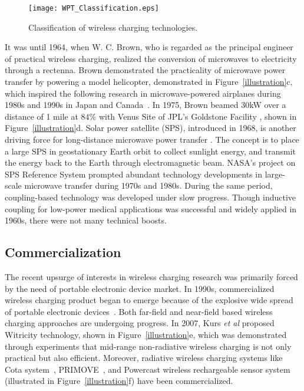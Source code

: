 \documentclass[twocolumn,10pt]{IEEEtran}
\begin{document}
\begin{figure*}
\centering
\texttt{[image: WPT\_Classification.eps]}
\caption{Classification of wireless charging technologies.} \label{WPT_Classification}
\end{figure*}




It was until 1964, when W. C. Brown, who is regarded as the principal engineer of practical wireless charging, realized the conversion of microwaves to electricity through a rectenna.
Brown demonstrated the practicality of microwave power transfer by powering a model helicopter, demonstrated in Figure~\ref{illustration}c, which inspired the following research in microwave-powered airplanes during 1980s and 1990s in Japan and Canada~\cite{J.1988Schlesak}. In 1975, Brown beamed 30kW over a distance of 1 mile at $84\%$ with Venus Site of JPL’s Goldstone Facility \cite{B.2013Strassner}, shown in Figure~\ref{illustration}d.
Solar power satellite (SPS), introduced in 1968, is another driving force for long-distance microwave power transfer \cite{O.2002McSpadden}. The concept is to place a large SPS in geostationary Earth orbit to collect sunlight energy, and transmit the energy back to the Earth through electromagnetic beam. NASA's project on SPS Reference System prompted abundant technology developments in large-scale microwave transfer during 1970s and 1980s. 
During the same period, coupling-based technology was developed under slow progress. Though inductive coupling for low-power medical applications was successful and widely applied in 1960s, there were not many technical boosts.     

\subsection{Commercialization}

The recent upsurge of interests in wireless charging research was primarily forced by the need of portable electronic device market. In 1990s, commercialized wireless charging product began to emerge because of the explosive wide spread of portable electronic devices~\cite{A.2006Vanderelli}. Both far-field and near-field based wireless charging approaches are undergoing progress. In 2007, Kurs \emph{et al} proposed Witricity technology, shown in Figure~\ref{illustration}e, which was demonstrated through experiments that mid-range non-radiative wireless charging is not only practical but also efficient. Moreover, radiative wireless charging systems like Cota system~\cite{cota_system}, PRIMOVE~\cite{primove}, and Powercast wireless rechargeable sensor system \cite{Powercast} (illustrated in Figure~\ref{illustration}f) have been commercialized.  
\end{document}
